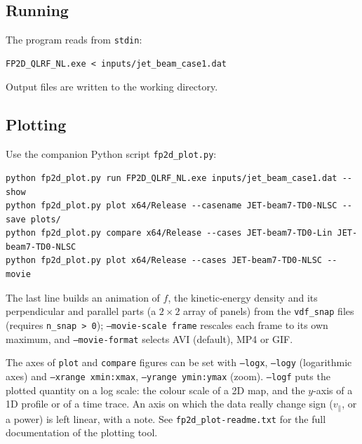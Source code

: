 \documentclass[11pt,a4paper]{article}
\newcommand{\vpa}{v_\parallel}
\begin{document}
\subsection{Running}

The program reads from \texttt{stdin}:
\begin{lstlisting}
FP2D_QLRF_NL.exe < inputs/jet_beam_case1.dat
\end{lstlisting}
Output files are written to the working directory.

\subsection{Plotting}
\label{sec:plotting}

Use the companion Python script \texttt{fp2d\_plot.py}:
\begin{lstlisting}
python fp2d_plot.py run FP2D_QLRF_NL.exe inputs/jet_beam_case1.dat --show
python fp2d_plot.py plot x64/Release --casename JET-beam7-TD0-NLSC --save plots/
python fp2d_plot.py compare x64/Release --cases JET-beam7-TD0-Lin JET-beam7-TD0-NLSC
python fp2d_plot.py plot x64/Release --cases JET-beam7-TD0-NLSC --movie
\end{lstlisting}
The last line builds an animation of $f$, the kinetic-energy density and its
perpendicular and parallel parts (a $2\times2$ array of panels) from the \texttt{vdf\_snap} files (requires \texttt{n\_snap > 0}); \texttt{--movie-scale
frame} rescales each frame to its own maximum, and \texttt{--movie-format}
selects AVI (default), MP4 or GIF.

The axes of \texttt{plot} and \texttt{compare} figures can be set with
\texttt{--logx}, \texttt{--logy} (logarithmic axes) and
\texttt{--xrange xmin:xmax}, \texttt{--yrange ymin:ymax} (zoom).
\texttt{--logf} puts the plotted quantity on a log scale: the colour scale of a
2D map, and the $y$-axis of a 1D profile or of a time trace.  An axis on which
the data really change sign ($\vpa$, or a power) is left linear, with a note.
See \texttt{fp2d\_plot-readme.txt} for the full documentation of the
plotting tool.
\end{document}
